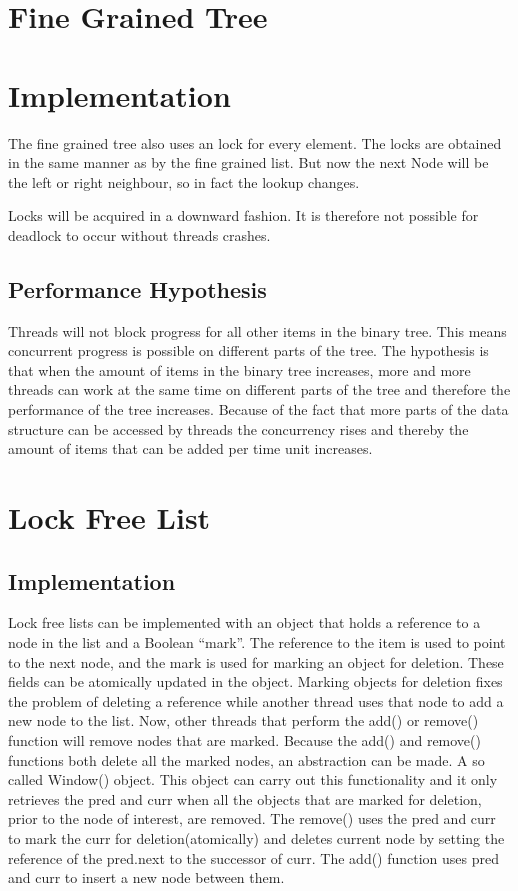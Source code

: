 \documentclass[10pt,a4paper]{article}
\begin{document}
\section{Fine Grained Tree} 
\section{Implementation}
The fine grained tree also uses an lock for every
element.  The locks are obtained in the same manner as by the fine grained
list. But now the next Node will be the left or right neighbour, so in fact the
lookup changes. 

Locks will be acquired in a downward fashion. It is therefore not possible for
deadlock to occur without threads crashes.

\subsection{Performance Hypothesis}
Threads will not block progress for all
other items in the binary tree. This means concurrent progress is possible on
different parts of the tree.  The hypothesis is that when the amount of items
in the binary tree increases, more and more threads can work at the same time
on different parts of the tree and therefore the performance of the tree
increases. Because of the fact that more parts of the data structure can be
accessed by threads the concurrency rises and thereby the amount of items that
can be added per time unit increases.


\section{Lock Free List}
\subsection{Implementation}
Lock free lists can be
implemented with an object that holds a reference to a node in the list and a
Boolean ``mark''. The reference to the item is used to point to the next node,
and the mark is used for marking an object for deletion. These fields can be
atomically updated in the object. Marking objects for deletion fixes the
problem of deleting a reference while another thread uses that node to add a
new node to the list. Now, other threads that perform the add() or remove()
function will remove nodes that are marked. Because the add() and remove()
functions both delete all the marked nodes, an abstraction can be made. A so
called Window() object. This object can carry out this functionality and it
only retrieves the pred and curr when all the objects that are marked for
deletion, prior to the node of interest, are removed. The remove() uses the
pred and curr to mark the curr for deletion(atomically) and deletes current
node by setting the reference of the pred.next to the successor of curr. The
add() function uses pred and curr to insert a new node between them.
\end{document}
